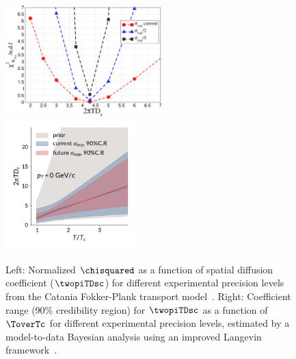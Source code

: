 \begin{figure}[ht]
	\begin{center}
		\includegraphics[width=0.54\textwidth]{hf/figures/chi_Raa_Ds.pdf}
		\includegraphics[width=0.45\textwidth]{hf/figures/Plot_posterior_D2piT_calibrate_on_Duke-central_p0.pdf}
		\caption{Left: Normalized $\chisquared$ as a function of spatial diffusion coefficient ($\twopiTDsc$) for different experimental precision levels from the Catania Fokker-Plank transport model~\cite{Das:2015ana,Das:2013kea}. Right: Coefficient range (90\% credibility region) for $\twopiTDsc$ as a function of $\ToverTc$ for different experimental precision levels, estimated by a model-to-data Bayesian analysis using an improved Langevin framework~\cite{PhysRevC.97.014907}.}
		\label{fig:RAAv2.Dstheory}
	\end{center}
\end{figure}

